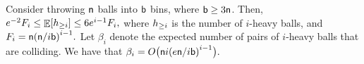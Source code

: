 \begin{lemma}%
    Consider throwing $\mathsf{n}$ balls into $\mathsf{b}$ bins, where
    $\mathsf{b} \geq 3 \mathsf{n}$. Then,
    \begin{math}
        e^{-2} F_i \leq%
        \Ex{\NHX{i}} %
        \leq 6e^{i-1} F_i,
    \end{math}
    where $h_{\geq i}$ is the number of $i$-heavy balls, and
    \begin{math}
        F_i = \nballs \pth{{\nballs}/{i \nbins}}^{i-1}.
    \end{math}
    Let $\beta_i$ denote the expected number of pairs of $i$-heavy
    balls that are colliding. We have that
    \begin{math}
        \beta_i = O \bigl( \nballs i \pth{{e \nballs}/{i
              \nbins}}^{i-1} \bigr).
    \end{math}
\end{lemma}

